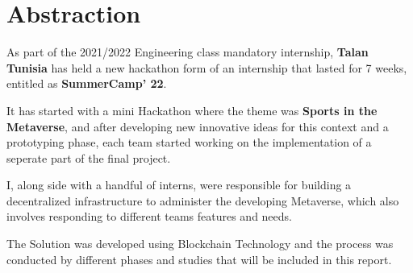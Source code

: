 \vspace{2in}

{}
\chapter*{Abstraction}
\bigskip 



As part of the 2021/2022 Engineering class mandatory internship, \textbf{Talan Tunisia}  has held a new hackathon form of an internship that lasted for 7 weeks, entitled as \textbf{SummerCamp' 22}. 
\bigskip 

\indent It has started with a mini Hackathon where the theme was \textbf{Sports in the Metaverse}, and after developing new innovative ideas for this context and a prototyping phase, each team started working on the implementation of a seperate part of the final project.
\bigskip 

\indent I, along side with a handful of interns, were responsible for building a decentralized infrastructure to administer the developing Metaverse, which also involves responding to different teams features and needs.  

\bigskip 

\indent The Solution was developed using Blockchain Technology and the process was conducted by different phases and studies that will be included in this report.


